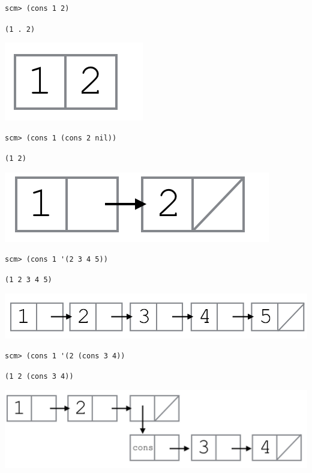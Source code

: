 \begin{lstlisting}
scm> (cons 1 2)
\end{lstlisting}
\begin{solution}[0.25in]
\texttt{(1 . 2)}
\begin{center}
\includegraphics[scale=1]{scheme_lists_1}
\end{center}
\end{solution}

\begin{lstlisting}
scm> (cons 1 (cons 2 nil))
\end{lstlisting}
\begin{solution}[0.25in]
\texttt{(1 2)}
\begin{center}
\includegraphics[scale=0.7]{scheme_lists_2}
\end{center}
\end{solution}

\begin{lstlisting}
scm> (cons 1 '(2 3 4 5))
\end{lstlisting}
\begin{solution}[0.25in]
\texttt{(1 2 3 4 5)}
\begin{center}
\includegraphics[scale=0.7]{scheme_lists_3}
\end{center}
\end{solution}

\begin{lstlisting}
scm> (cons 1 '(2 (cons 3 4))
\end{lstlisting}
\begin{solution}[0.25in]
\texttt{(1 2 (cons 3 4))}
\begin{center}
\includegraphics[scale=0.7]{scheme_lists_4}
\end{center}
\end{solution}

